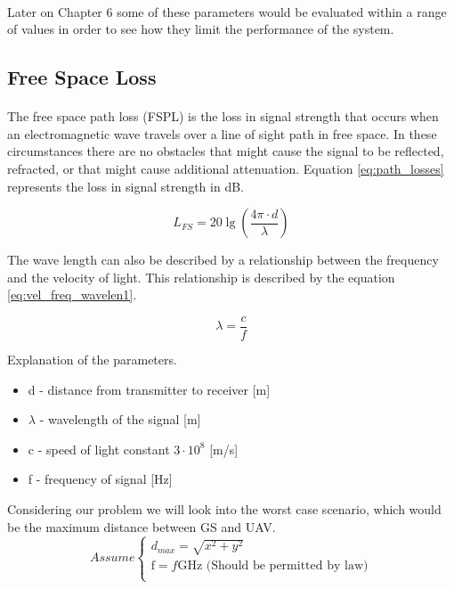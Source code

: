 \paragraph{}Later on Chapter 6 some of these parameters would be evaluated within a range of values in order to see how they limit the performance of the system. 

\subsection{Free Space Loss}\label{subsec:path_loss}
\paragraph{}
The free space path loss (FSPL) is the loss in signal strength that occurs when an electromagnetic wave travels over a line of sight path in free space. In these circumstances there are no obstacles that might cause the signal to be reflected, refracted, or that might cause additional attenuation. Equation \ref{eq:path_losses} represents the loss in signal strength in dB.

\begin{equation}\label{eq:path_losses}
	L_{FS} = 20\lg\left (\frac{4\pi \cdot d}{\lambda} \right)
\end{equation}

The wave length can also be described by a relationship between the frequency and the velocity of light. This relationship is described by the equation \ref{eq:vel_freq_wavelen1}.

\begin{equation}\label{eq:vel_freq_wavelen1}
	\lambda = \frac{c}{f}
\end{equation}

Explanation of the parameters.
\begin{itemize}
	\item d - distance from transmitter to receiver [m]
	\item $\lambda$ - wavelength of the signal [m]
	\item c - speed of light constant $3\cdot 10^8$ [m/s] 
	\item f - frequency of signal [Hz]
\end{itemize}

Considering our problem we will look into the worst case scenario, which would be the maximum distance between GS and UAV. 
\begin{equation*}
	Assume 
	\begin{cases}
	d_{max} = \sqrt{x^2+y^2}\\
	\text{f} = f\text{GHz (Should be permitted by law})\\
	\end{cases}
\end{equation*}


